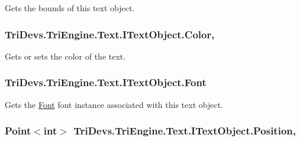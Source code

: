 Gets the bounds of this text object. 

\hypertarget{interface_tri_devs_1_1_tri_engine_1_1_text_1_1_i_text_object_aa4dc850c84434169ccd61eb6d895412a}{
\subsubsection[{Color}]{ Tri\-Devs.\-Tri\-Engine.\-Text.\-I\-Text\-Object.\-Color\hspace{0.3cm}{\ttfamily [get]}, {\ttfamily [set]}}}\label{interface_tri_devs_1_1_tri_engine_1_1_text_1_1_i_text_object_aa4dc850c84434169ccd61eb6d895412a}


Gets or sets the color of the text. 

\hypertarget{interface_tri_devs_1_1_tri_engine_1_1_text_1_1_i_text_object_a638f5e225cfe81ed5312d7b8ec18ffb3}{
\subsubsection[{Font}]{ Tri\-Devs.\-Tri\-Engine.\-Text.\-I\-Text\-Object.\-Font\hspace{0.3cm}{\ttfamily [get]}}}\label{interface_tri_devs_1_1_tri_engine_1_1_text_1_1_i_text_object_a638f5e225cfe81ed5312d7b8ec18ffb3}


Gets the \hyperlink{class_tri_devs_1_1_tri_engine_1_1_text_1_1_font}{Font} font instance associated with this text object. 

\hypertarget{interface_tri_devs_1_1_tri_engine_1_1_text_1_1_i_text_object_a2d3a38a11fd0a84360e32122668901ab}{
\subsubsection[{Position}]{\setlength{\rightskip}{0pt plus 5cm}Point$<$int$>$ Tri\-Devs.\-Tri\-Engine.\-Text.\-I\-Text\-Object.\-Position\hspace{0.3cm}{\ttfamily [get]}, {\ttfamily [set]}}}\label{interface_tri_devs_1_1_tri_engine_1_1_text_1_1_i_text_object_a2d3a38a11fd0a84360e32122668901ab}


